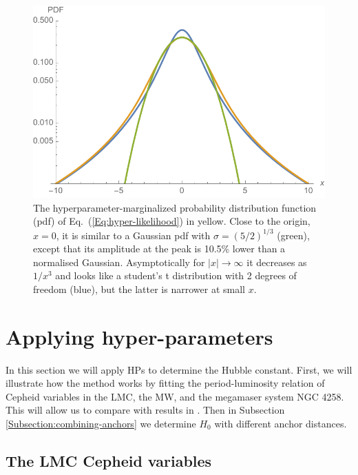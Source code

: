 
\begin{figure}[hbtp]
\centering
\includegraphics[scale=1]{figures/chapter-h0/hyperparam_like.pdf}
\caption{The hyperparameter-marginalized probability distribution function (pdf) of Eq.\ (\ref{Eq:hyper-likelihood}) in yellow. Close to the origin, $x=0$, it is similar to a Gaussian pdf with $\sigma = (5/2)^{1/3}$ (green), except that its amplitude at the peak is 10.5\% lower than a normalised Gaussian. Asymptotically for $|x|\rightarrow\infty$ it decreases as $1/x^3$ and looks like a student's t distribution with 2 degrees of freedom (blue), but the latter is narrower at small $x$.}
\end{figure}

\section{Applying hyper-parameters}
\label{chapter-h0:Application}

In this section we will apply HPs to determine the Hubble constant. First, we will illustrate how the method works by fitting the period-luminosity relation of Cepheid variables in the LMC, the MW, and the megamaser system NGC 4258. This will allow us to compare with results in \cite{Efstathiou:2013via}. Then in Subsection \ref{Subsection:combining-anchors} we determine $H_0$ with different anchor distances. 

\subsection{The LMC Cepheid variables}
\label{Subsection:LMC}


